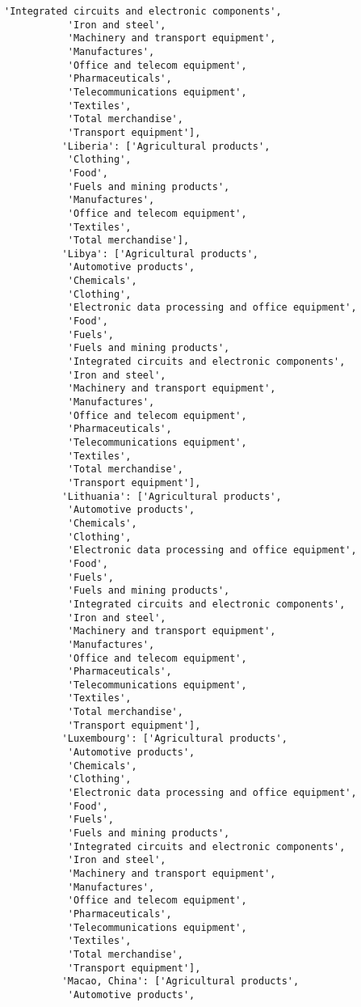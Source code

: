 \documentclass[11pt]{article}
\begin{document}
\begin{Verbatim}[commandchars=\\\{\}]
           'Integrated circuits and electronic components',
           'Iron and steel',
           'Machinery and transport equipment',
           'Manufactures',
           'Office and telecom equipment',
           'Pharmaceuticals',
           'Telecommunications equipment',
           'Textiles',
           'Total merchandise',
           'Transport equipment'],
          'Liberia': ['Agricultural products',
           'Clothing',
           'Food',
           'Fuels and mining products',
           'Manufactures',
           'Office and telecom equipment',
           'Textiles',
           'Total merchandise'],
          'Libya': ['Agricultural products',
           'Automotive products',
           'Chemicals',
           'Clothing',
           'Electronic data processing and office equipment',
           'Food',
           'Fuels',
           'Fuels and mining products',
           'Integrated circuits and electronic components',
           'Iron and steel',
           'Machinery and transport equipment',
           'Manufactures',
           'Office and telecom equipment',
           'Pharmaceuticals',
           'Telecommunications equipment',
           'Textiles',
           'Total merchandise',
           'Transport equipment'],
          'Lithuania': ['Agricultural products',
           'Automotive products',
           'Chemicals',
           'Clothing',
           'Electronic data processing and office equipment',
           'Food',
           'Fuels',
           'Fuels and mining products',
           'Integrated circuits and electronic components',
           'Iron and steel',
           'Machinery and transport equipment',
           'Manufactures',
           'Office and telecom equipment',
           'Pharmaceuticals',
           'Telecommunications equipment',
           'Textiles',
           'Total merchandise',
           'Transport equipment'],
          'Luxembourg': ['Agricultural products',
           'Automotive products',
           'Chemicals',
           'Clothing',
           'Electronic data processing and office equipment',
           'Food',
           'Fuels',
           'Fuels and mining products',
           'Integrated circuits and electronic components',
           'Iron and steel',
           'Machinery and transport equipment',
           'Manufactures',
           'Office and telecom equipment',
           'Pharmaceuticals',
           'Telecommunications equipment',
           'Textiles',
           'Total merchandise',
           'Transport equipment'],
          'Macao, China': ['Agricultural products',
           'Automotive products',

\end{Verbatim}
\end{document}
